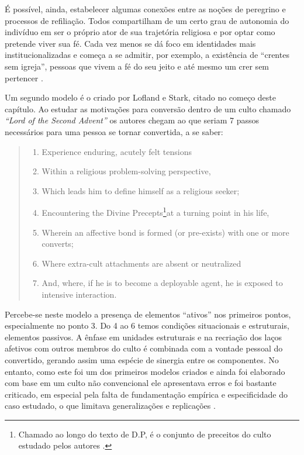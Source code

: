 \documentclass[
	12pt,				%
	oneside,			%
	a4paper,			%
	sumario=tradicional,
	english,			%
	brazil				%
	]{abntex2}
\begin{document}
É possível, ainda, estabelecer algumas conexões entre as noções de peregrino e processos de refiliação. Todos compartilham de um certo grau de autonomia do indivíduo em ser o próprio ator de sua trajetória religiosa e por optar como pretende viver sua fé. Cada vez menos se dá foco em identidades mais institucionalizadas e começa a se admitir, por exemplo, a existência de ``crentes sem igreja'', pessoas que vivem a fé do seu jeito e até mesmo um crer sem pertencer \autocites[135]{davie_believing_1990,willaime_sociologia_2012-1}.

Um segundo modelo é o criado por Lofland e Stark, citado no começo deste capítulo. Ao estudar as motivações para conversão dentro de um culto chamado \emph{``Lord of the Second Advent''} os autores chegam ao que seriam 7 passos necessários para uma pessoa se tornar convertida, a se saber:
\begin{quote}
\begin{enumerate}
\def\labelenumi{\arabic{enumi}.}
\tightlist
\item
  Experience enduring, acutely felt tensions
\item
  Within a religious problem-solving perspective,
\item
  Which leads him to define himself as a religious seeker;
\item
  Encountering the Divine Precepts\footnote{Chamado ao longo do texto de D.P, é o conjunto de preceitos do culto estudado pelos autores \autocite[863]{lofland_becoming_1965-1}.}at a turning point in his life,
\item
  Wherein an affective bond is formed (or pre-exists) with one or more converts;
\item
  Where extra-cult attachments are absent or neutralized
\item
  And, where, if he is to become a deployable agent, he is exposed to intensive interaction.
  \autocite[874]{lofland_becoming_1965-1}
\end{enumerate}
\end{quote}
Percebe-se neste modelo a presença de elementos ``ativos'' nos primeiros pontos, especialmente no ponto 3. Do 4 ao 6 temos condições situacionais e estruturais, elementos passivos. A ênfase em unidades estruturais e na recriação dos laços afetivos com outros membros do culto é combinada com a vontade pessoal do convertido, gerando assim uma espécie de sinergia entre os componentes. No entanto, como este foi um dos primeiros modelos criados e ainda foi elaborado com base em um culto não convencional ele apresentava erros e foi bastante criticado, em especial pela falta de fundamentação empírica e especificidade do caso estudado, o que limitava generalizações e replicações \autocite[338]{gooren_reassessing_2007-1}.
\end{document}

